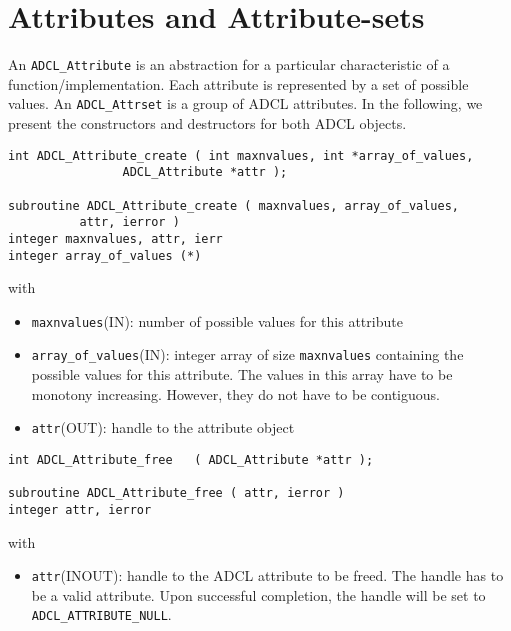 \section{Attributes and Attribute-sets}

An {\tt ADCL\_Attribute} is an abstraction for a particular characteristic of a function/implementation. Each attribute is represented by a set of possible values.  An {\tt ADCL\_Attrset} is a group of ADCL attributes.
In the following, we present the constructors and destructors for both ADCL objects.

\begin{verbatim}
int ADCL_Attribute_create ( int maxnvalues, int *array_of_values, 
			    ADCL_Attribute *attr );

subroutine ADCL_Attribute_create ( maxnvalues, array_of_values, 
          attr, ierror )
integer maxnvalues, attr, ierr
integer array_of_values (*)
\end{verbatim}
with
\begin{itemize}
\item {\tt maxnvalues}(IN): number of possible values for this attribute
\item {\tt array\_of\_values}(IN): integer array of size {\tt maxnvalues} containing the possible values for this 
  attribute. The values in this array have to be monotony increasing. However, they do not have to be contiguous.
\item {\tt attr}(OUT): handle to the attribute object
\end{itemize} 	

\hspace{1cm}
\begin{verbatim}
int ADCL_Attribute_free   ( ADCL_Attribute *attr );

subroutine ADCL_Attribute_free ( attr, ierror )
integer attr, ierror
\end{verbatim}
with
\begin{itemize}
\item {\tt attr}(INOUT): handle to the ADCL attribute to be freed. The handle has to be a valid attribute.
    	Upon successful completion, the handle will be set to {\tt ADCL\_ATTRIBUTE\_NULL}.
\end{itemize}


